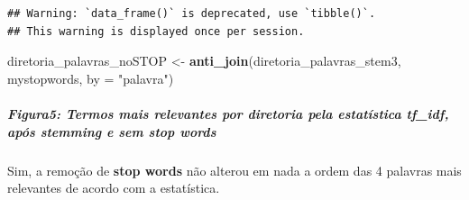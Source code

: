 \documentclass[]{article}
\newenvironment{Shaded}{\begin{snugshade}}{\end{snugshade}}
\newcommand{\KeywordTok}[1]{\textcolor[rgb]{0.13,0.29,0.53}{\textbf{#1}}}
\newcommand{\DataTypeTok}[1]{\textcolor[rgb]{0.13,0.29,0.53}{#1}}
\newcommand{\StringTok}[1]{\textcolor[rgb]{0.31,0.60,0.02}{#1}}
\newcommand{\NormalTok}[1]{#1}
\let\oldsubparagraph\subparagraph
\renewcommand{\subparagraph}[1]{\oldsubparagraph{#1}\mbox{}}
\begin{document}
\begin{verbatim}
## Warning: `data_frame()` is deprecated, use `tibble()`.
## This warning is displayed once per session.
\end{verbatim}

\begin{Shaded}
\begin{Highlighting}[]
\NormalTok{diretoria_palavras_noSTOP <-}\StringTok{ }\KeywordTok{anti_join}\NormalTok{(diretoria_palavras_stem3, mystopwords, }
                                       \DataTypeTok{by =} \StringTok{"palavra"}\NormalTok{)}
\end{Highlighting}
\end{Shaded}

\subparagraph{\texorpdfstring{Figura5: Termos mais relevantes por
diretoria pela estatística \textbf{tf\_idf}, após \textbf{stemming} e
sem \textbf{stop
words}}{Figura5: Termos mais relevantes por diretoria pela estatística tf\_idf, após stemming e sem stop words}}\label{figura5-termos-mais-relevantes-por-diretoria-pela-estatistica-tf_idf-apos-stemming-e-sem-stop-words}

Sim, a remoção de \textbf{stop words} não alterou em nada a ordem das 4
palavras mais relevantes de acordo com a estatística.
\end{document}
